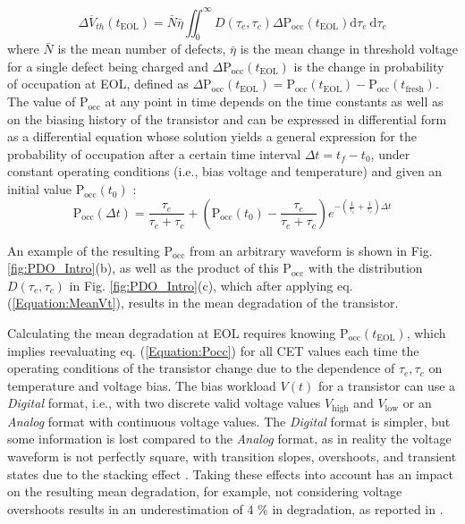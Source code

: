 \begin{equation}
\label{Equation:MeanVt}
\overline{\Delta V_{t h}}\left(t_\text{EOL}\right)=\bar{N} \bar{\eta} \iint_0^{\infty} D\left(\tau_e, \tau_c\right)  \Delta \text{P}_{\text{occ}}\left( t_\text{EOL}\right) \mathrm{d} \tau_e \mathrm{~d} \tau_c
\end{equation}
where $\bar{N}$ is the mean number of defects, $ \bar{\eta} $ is the mean change in threshold voltage for a single defect being charged and $\Delta \text{P}_{\text{occ}}\left(t_\text{EOL}\right)$ is the change in probability of occupation at EOL, defined as $\Delta \text{P}_{\text{occ}}\left( t_\text{EOL}\right) = \text{P}_{\text{occ}}\left(t_\text{EOL}\right) - \text{P}_{\text{occ}}\left(t_\text{fresh}\right)$. The value of $\text{P}_{\text{occ}}$ at any point in time depends on the time constants as well as on the biasing history of the transistor and can be expressed in differential form as a differential equation \cite{saraza-canflancaDeterminationTimeConstant2022} whose solution yields a general expression for the probability of occupation after a certain time interval $\Delta t =t_f - t_0$, under constant operating conditions (i.e., bias voltage and temperature) and given an initial value $\text{P}_{\text{occ}}(t_0)$ :
\begin{equation}
\label{Equation:Pocc}
\text{P}_{\text{occ}}(\Delta t)=\frac{\tau_e}{\tau_e+\tau_c}+\left(\text{P}_{\text{occ}}(t_0)-\frac{\tau_e}{\tau_e+\tau_c}\right) e^{-\left(\frac{1}{\tau_e}+\frac{1}{\tau_c}\right) \Delta t}
\end{equation}

An example of the resulting $\text{P}_{\text{occ}}$ from an arbitrary waveform is shown in Fig. \ref{fig:PDO_Intro}(b), as well as the product of this $\text{P}_{\text{occ}}$ with the distribution $D\left(\tau_e, \tau_c\right)$ in Fig. \ref{fig:PDO_Intro}(c), which after applying eq. (\ref{Equation:MeanVt}), results in the mean degradation of the transistor. 

Calculating the mean degradation at EOL requires knowing $\text{P}_{\text{occ}}(t_\text{EOL})$, which implies reevaluating eq. (\ref{Equation:Pocc}) for all CET values each time the operating conditions of the transistor change due to the dependence of ${\tau_e},{\tau_c}$ on temperature and voltage bias. The bias workload $V(t)$ for a transistor can use a \textit{Digital} format, i.e., with two discrete valid voltage values $V_{\text{high}}$ and $V_{\text{low}}$ or an \textit{Analog} format with continuous voltage values. The \textit{Digital} format is simpler, but some information is lost compared to the \textit{Analog} format, as in reality the voltage waveform is not perfectly square, with transition slopes, overshoots, and transient states due to the stacking effect \cite{HongStacking2007, firouziLinearProgrammingApproach2011}. Taking these effects into account has an impact on the resulting mean degradation, for example, not considering voltage overshoots results in an underestimation of 4 \% in degradation, as reported in \cite{gieringNBTIModelingAnalog2014}. 

